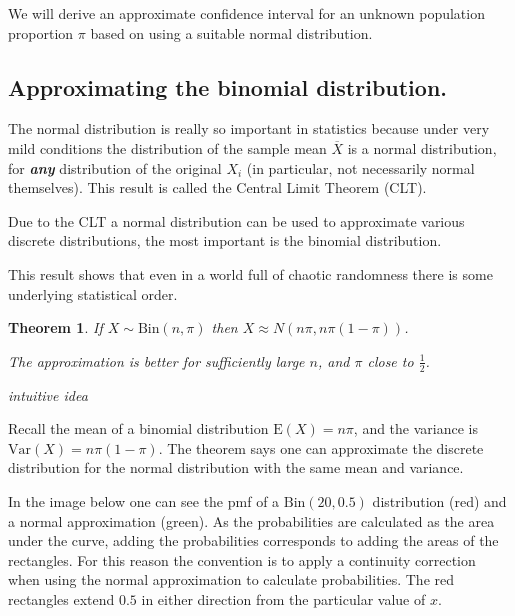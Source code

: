 \documentclass[
]{book}
\newtheorem{theorem}{Theorem}[chapter]
\theoremstyle{definition}
\theoremstyle{definition}
\theoremstyle{definition}
\theoremstyle{definition}
\theoremstyle{remark}
\begin{document}
We will derive an approximate confidence interval for an unknown population proportion \(\pi\) based on using a suitable normal distribution.

\hypertarget{approximating-the-binomial-distribution.}{%
\subsection{Approximating the binomial distribution.}\label{approximating-the-binomial-distribution.}}

The normal distribution is really so important in statistics because under very mild conditions the distribution of the sample mean \(\overline{X}\) is a normal distribution, for \textbf{\emph{any}} distribution of the original \(X_i\) (in particular, not necessarily normal themselves). This result is called the Central Limit Theorem (CLT).

Due to the CLT a normal distribution can be used to approximate various discrete distributions, the most important is the binomial distribution.

This result shows that even in a world full of chaotic randomness there is some underlying statistical order.

\begin{theorem}
If \(X\sim \text{Bin}(n,\pi)\) then \(X\approx N(n\pi,n\pi(1-\pi))\).

The approximation is better for sufficiently large \(n\), and \(\pi\) close to \(\frac{1}{2}\).
\end{theorem}

\emph{intuitive idea}

Recall the mean of a binomial distribution \(\text{E}(X)=n\pi\), and the variance is \(\text{Var}(X)=n\pi(1-\pi)\). The theorem says one can approximate the discrete distribution for the normal distribution with the same mean and variance.

In the image below one can see the pmf of a \(\text{Bin}(20,0.5)\) distribution (red) and a normal approximation (green). As the probabilities are calculated as the area under the curve, adding the probabilities corresponds to adding the areas of the rectangles. For this reason the convention is to apply a continuity correction when using the normal approximation to calculate probabilities. The red rectangles extend \(0.5\) in either direction from the particular value of \(x\).
\end{document}
